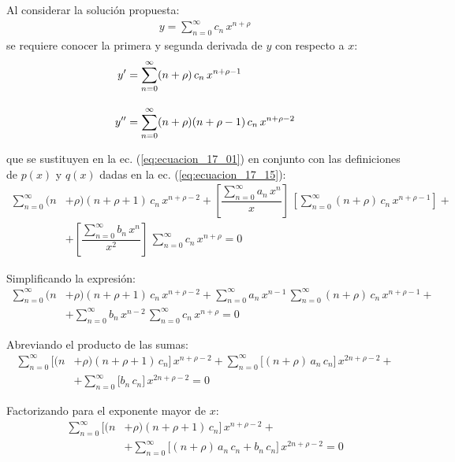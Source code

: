 Al considerar la solución propuesta:
\begin{align*}
y = \sum_{n=0}^{\infty} c_{n} \, x^{n+\rho}
\end{align*}
se requiere conocer la primera y  segunda derivada de $y$ con respecto a $x$:
\begin{align*}
{y}^{\prime} &= \sum_{n=0}^{\infty} (n + \rho) \, c_{n} \, x^{n+\rho-1} \\[1em]
{y}^{\prime \prime} &= \sum_{n=0}^{\infty} (n + \rho)(n + \rho - 1) \, c_{n} \, x^{n+\rho-2}
\end{align*}

que se sustituyen en la ec. (\ref{eq:ecuacion_17_01}) en conjunto con las definiciones de $p(x)$ y $q(x)$ dadas en la ec. (\ref{eq:ecuacion_17_15}):
\begin{align*}
\sum_{n=0}^{\infty} (n &+ \rho)(n + \rho + 1) \, c_{n} \, x^{n+\rho-2} + \left[ \dfrac{\displaystyle \sum_{n=0}^{\infty} a_{n} \, x^{n}}{x} \right] \, \left[ \sum_{n=0}^{\infty} (n + \rho) \, c_{n} \, x^{n+\rho-1} \right] + \\[1em]
&+ \left[ \dfrac{\displaystyle \sum_{n=0}^{\infty} b_{n} \, x^{n}}{x^{2}} \right] \, \sum_{n=0}^{\infty} c_{n} \, x^{n+\rho} = 0
\end{align*}

Simplificando la expresión:
\begin{align*}
\sum_{n=0}^{\infty} (n &+ \rho)(n + \rho + 1) \, c_{n} \, x^{n+\rho-2} + \sum_{n=0}^{\infty} a_{n} \, x^{n-1} \, \sum_{n=0}^{\infty} (n + \rho) \, c_{n} \, x^{n+\rho-1} + \\[1em]
&+ \sum_{n=0}^{\infty} b_{n} \, x^{n-2} \, \sum_{n=0}^{\infty} c_{n} \, x^{n+\rho} = 0
\end{align*}

Abreviando el producto de las sumas:
\begin{align*}
\sum_{n=0}^{\infty} \big[ (n &+ \rho)(n + \rho + 1) \, c_{n} \big] \, x^{n+\rho-2} + \sum_{n=0}^{\infty} \big[ (n + \rho) \, a_{n} \, c_{n} \big] \, x^{2n+\rho-2} + \\[1em]
&+ \sum_{n=0}^{\infty} \big[ b_{n} \, c_{n} \big] \, x^{2n+\rho-2} = 0
\end{align*}

Factorizando para el exponente mayor de $x$:
\begin{align*}
\sum_{n=0}^{\infty} \big[ (n &+ \rho)(n + \rho + 1) \, c_{n} \big] \, x^{n+\rho-2} + \\[1em]
&+ \sum_{n=0}^{\infty} \big[ (n + \rho) \, a_{n} \, c_{n} + b_{n} \, c_{n} \big] \, x^{2n+\rho-2} = 0
\end{align*}

